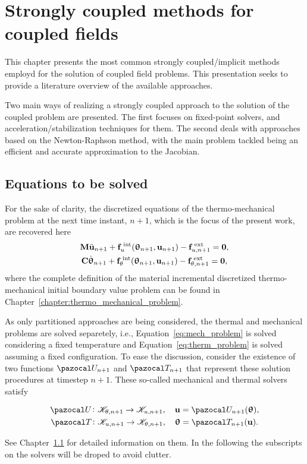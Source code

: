 \chapter{Strongly coupled methods for coupled fields}

This chapter presents the most common strongly coupled/implicit methods employd for the solution of coupled field problems.
This presentation seeks to provide a literature overview of the available approaches.

Two main ways of realizing a strongly coupled approach to the solution of the coupled problem are presented.
The first focuses on fixed-point solvers, and acceleration/stabilization techniques for them.
The second deals with approaches based on the Newton-Raphson method, with the main problem tackled being an efficient and accurate approximation to the Jacobian.

\section{Equations to be solved}

For the sake of clarity, the discretized equations of the thermo-mechanical problem at the next time instant, \(n+1\), which is the focus of the present work, are recovered here
\begin{gather}
    \mathbf M \ddot{\mathbf u}_{n+1} +\mathbf f_u^\text{\;int}(\bm \uptheta_{n+1}, \mathbf u_{n+1})-\mathbf f^\text{\;ext}_{u,n+1}=\mathbf 0, \label{eq:mech_problem} \\
    \mathbf C \dot{\bm \uptheta}_{n+1} +\mathbf f_\theta^\text{\;int}(\bm \uptheta_{n+1}, \mathbf u_{n+1})-\mathbf f^\text{\;ext}_{\theta,n+1}=\mathbf 0, \label{eq:therm_problem}
\end{gather}
where the complete definition of the material incremental discretized thermo-mechanical initial boundary value problem can be found in Chapter~\ref{chapter:thermo_mechanical_problem}.

As only partitioned approaches are being considered, the thermal and mechanical problems are solved separetely, i.e., Equation~\eqref{eq:mech_problem} is solved considering a fixed temperature and Equation~\eqref{eq:therm_problem} is solved assuming a fixed configuration.
To ease the discussion, consider the existence of two functions \(\pazocal U_{n+1}\) and \(\pazocal T_{n+1}\) that represent these solution procedures at timestep \(n+1\).
These so-called mechanical and thermal solvers satisfy
\begin{highlight}[innertopmargin=-5pt]
\begin{gather}
  \pazocal U\colon \mathscr K_{\theta, n+1}\to \mathscr K_{u,n+1},\quad \mathbf u = \pazocal U_{n+1}(\bm \uptheta),\\
  \pazocal T\colon \mathscr K_{u,n+1}\to \mathscr K_{\theta, n+1},\quad \bm \uptheta = \pazocal T_{n+1}(\mathbf u).
\end{gather}
\end{highlight}
See Chapter~\ref{} for detailed information on them.
In the following the subscripts on the solvers will be droped to avoid clutter.

